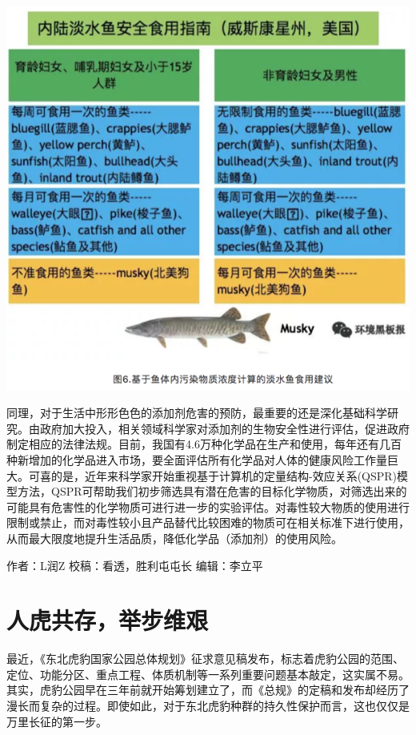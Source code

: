 \documentclass[]{book}
\begin{document}
\includegraphics[width=8.33in]{images/epc6}

同理，对于生活中形形色色的添加剂危害的预防，最重要的还是深化基础科学研究。由政府加大投入，相关领域科学家对添加剂的生物安全性进行评估，促进政府制定相应的法律法规。目前，我国有4.6万种化学品在生产和使用，每年还有几百种新增加的化学品进入市场，要全面评估所有化学品对人体的健康风险工作量巨大。可喜的是，近年来科学家开始重视基于计算机的定量结构-效应关系(QSPR)模型方法，QSPR可帮助我们初步筛选具有潜在危害的目标化学物质，对筛选出来的可能具有危害性的化学物质可进行进一步的实验评估。对毒性较大物质的使用进行限制或禁止，而对毒性较小且产品替代比较困难的物质可在相关标准下进行使用，从而最大限度地提升生活品质，降低化学品（添加剂）的使用风险。

作者：L润Z
校稿：看透，胜利屯屯长
编辑：李立平

\hypertarget{ux4ebaux864eux5171ux5b58ux4e3eux6b65ux7ef4ux8270}{%
\section{人虎共存，举步维艰}\label{ux4ebaux864eux5171ux5b58ux4e3eux6b65ux7ef4ux8270}}

最近，《东北虎豹国家公园总体规划》征求意见稿发布，标志着虎豹公园的范围、定位、功能分区、重点工程、体质机制等一系列重要问题基本敲定，这实属不易。其实，虎豹公园早在三年前就开始筹划建立了，而《总规》的定稿和发布却经历了漫长而复杂的过程。即使如此，对于东北虎豹种群的持久性保护而言，这也仅仅是万里长征的第一步。
\end{document}
